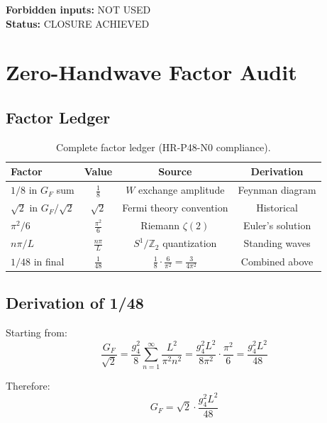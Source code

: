 \documentclass[11pt,a4paper]{article}
\begin{document}
\textbf{Forbidden inputs:} NOT USED \\
\textbf{Status:} CLOSURE ACHIEVED

\section{Zero-Handwave Factor Audit}
\label{sec:factor-audit}

\subsection{Factor Ledger}
\label{subsec:factor-ledger}

\begin{table}[ht]
\centering
\caption{Complete factor ledger (HR-P48-N0 compliance).}
\label{tab:factor-ledger}
\begin{tabular}{lccc}
\toprule
Factor & Value & Source & Derivation \\
\midrule
$1/8$ in $G_F$ sum & $\frac{1}{8}$ & $W$ exchange amplitude & Feynman diagram \\
$\sqrt{2}$ in $G_F/\sqrt{2}$ & $\sqrt{2}$ & Fermi theory convention & Historical \\
$\pi^2/6$ & $\frac{\pi^2}{6}$ & Riemann $\zeta(2)$ & Euler's solution \\
$n\pi/L$ & $\frac{n\pi}{L}$ & $S^1/\mathbb{Z}_2$ quantization & Standing waves \\
$1/48$ in final & $\frac{1}{48}$ & $\frac{1}{8} \cdot \frac{6}{\pi^2} = \frac{3}{4\pi^2}$ & Combined above \\
\bottomrule
\end{tabular}
\end{table}

\subsection{Derivation of 1/48}
\label{subsec:48-derivation}

Starting from:
\begin{equation}
\label{eq:48-start}
\frac{G_F}{\sqrt{2}} = \frac{g_4^2}{8} \sum_{n=1}^{\infty} \frac{L^2}{\pi^2 n^2}
= \frac{g_4^2 L^2}{8\pi^2} \cdot \frac{\pi^2}{6}
= \frac{g_4^2 L^2}{48}
\end{equation}

Therefore:
\begin{equation}
\label{eq:48-result}
G_F = \sqrt{2} \cdot \frac{g_4^2 L^2}{48}
\end{equation}
\end{document}
